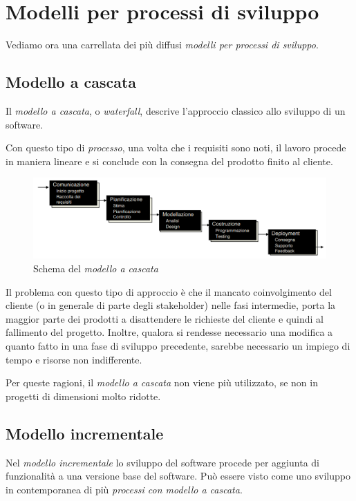 \documentclass[12pt, a4paper]{report}
\theoremstyle{def}
\theoremstyle{definition}
\begin{document}
\section{Modelli per processi di sviluppo}
Vediamo ora una carrellata dei più diffusi \emph{modelli per processi di sviluppo}.
\subsection{Modello a cascata}
Il \emph{modello a cascata}, o \emph{waterfall}, descrive l'approccio classico allo
sviluppo di un software.

Con questo tipo di \emph{processo}, una volta che i requisiti sono noti, il
lavoro procede in maniera lineare e si conclude con la consegna del prodotto
finito al cliente.

\begin{figure}[h]
    \centering
    \includegraphics[width=\textwidth]{modello-waterfall.png}
    \caption{Schema del \emph{modello a cascata}}
\end{figure}\noindent
Il problema con questo tipo di approccio è che il mancato coinvolgimento del
cliente (o in generale di parte degli stakeholder) nelle fasi intermedie, porta
la maggior parte dei prodotti a disattendere le richieste del cliente e quindi
al fallimento del progetto. Inoltre, qualora si rendesse necessario una modifica
a quanto fatto in una fase di sviluppo precedente, sarebbe necessario un
impiego di tempo e risorse non indifferente.

Per queste ragioni, il \emph{modello a cascata} non viene più utilizzato, se non
in progetti di dimensioni molto ridotte.

\subsection{Modello incrementale}
Nel \emph{modello incrementale} lo sviluppo del software procede per aggiunta
di funzionalità a una versione base del software. Può essere visto come
uno sviluppo in contemporanea di più \emph{processi con modello a cascata}.
\end{document}
